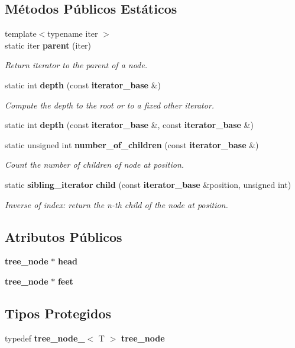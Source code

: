 \subsection*{Métodos Públicos Estáticos}
\begin{DoxyCompactItemize}
\item 
{\footnotesize template$<$typename iter $>$ }\\static iter {\bf parent} (iter)
\begin{DoxyCompactList}\small\item\em Return iterator to the parent of a node. \end{DoxyCompactList}\item 
static int {\bf depth} (const {\bf iterator\+\_\+base} \&)
\begin{DoxyCompactList}\small\item\em Compute the depth to the root or to a fixed other iterator. \end{DoxyCompactList}\item 
static int {\bf depth} (const {\bf iterator\+\_\+base} \&, const {\bf iterator\+\_\+base} \&)
\item 
static unsigned int {\bf number\+\_\+of\+\_\+children} (const {\bf iterator\+\_\+base} \&)
\begin{DoxyCompactList}\small\item\em Count the number of children of node at position. \end{DoxyCompactList}\item 
static {\bf sibling\+\_\+iterator} {\bf child} (const {\bf iterator\+\_\+base} \&position, unsigned int)
\begin{DoxyCompactList}\small\item\em Inverse of \textquotesingle{}index\textquotesingle{}\+: return the n-\/th child of the node at position. \end{DoxyCompactList}\end{DoxyCompactItemize}
\subsection*{Atributos Públicos}
\begin{DoxyCompactItemize}
\item 
{\bf tree\+\_\+node} $\ast$ {\bf head}
\item 
{\bf tree\+\_\+node} $\ast$ {\bf feet}
\end{DoxyCompactItemize}
\subsection*{Tipos Protegidos}
\begin{DoxyCompactItemize}
\item 
typedef {\bf tree\+\_\+node\+\_\+}$<$ T $>$ {\bf tree\+\_\+node}
\end{DoxyCompactItemize}


